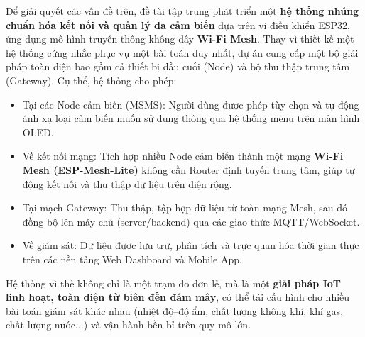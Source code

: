 \documentclass{article} %
\begin{document}
Để giải quyết các vấn đề trên, đề tài tập trung phát triển một \textbf{hệ thống nhúng chuẩn hóa kết nối và quản lý đa cảm biến} dựa trên vi điều khiển ESP32, ứng dụng mô hình truyền thông không dây \textbf{Wi-Fi Mesh}. Thay vì thiết kế một hệ thống cứng nhắc phục vụ một bài toán duy nhất, dự án cung cấp một bộ giải pháp toàn diện bao gồm cả thiết bị đầu cuối (Node) và bộ thu thập trung tâm (Gateway). Cụ thể, hệ thống cho phép:
\begin{itemize}
    \item Tại các Node cảm biến (MSMS): Người dùng được phép tùy chọn và tự động ánh xạ loại cảm biến muốn sử dụng thông qua hệ thống menu trên màn hình OLED.
    \item Về kết nối mạng: Tích hợp nhiều Node cảm biến thành một mạng \textbf{Wi-Fi Mesh (ESP-Mesh-Lite)} không cần Router định tuyến trung tâm, giúp tự động kết nối và thu thập dữ liệu trên diện rộng.
    \item Tại mạch Gateway: Thu thập, tập hợp dữ liệu từ toàn mạng Mesh, sau đó đồng bộ lên máy chủ (server/backend) qua các giao thức MQTT/WebSocket.
    \item Về giám sát: Dữ liệu được lưu trữ, phân tích và trực quan hóa thời gian thực trên các nền tảng Web Dashboard và Mobile App.
\end{itemize}

Hệ thống vì thế không chỉ là một trạm đo đơn lẻ, mà là một \textbf{giải pháp IoT linh hoạt, toàn diện từ biên đến đám mây}, có thể tái cấu hình cho nhiều bài toán giám sát khác nhau (nhiệt độ–độ ẩm, chất lượng không khí, khí gas, chất lượng nước...) và vận hành bền bỉ trên quy mô lớn.
\end{document}
